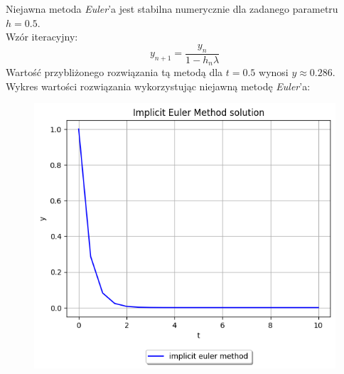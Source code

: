 \documentclass{article}
\begin{document}
Niejawna metoda \textit{Euler}'a jest stabilna numerycznie dla zadanego
parametru $h=0.5$.\\
Wzór iteracyjny:
$$y_{n+1} = \frac{y_n}{1 - h_n\lambda}$$
Wartość przybliżonego rozwiązania tą metodą dla $t=0.5$ wynosi
$y\approx 0.286$.\\

Wykres wartości rozwiązania wykorzystując niejawną metodę \textit{Euler}'a:
\begin{figure}[H]
  \includegraphics[width=\linewidth]{figures/implicit.png}
\end{figure}
\end{document}
